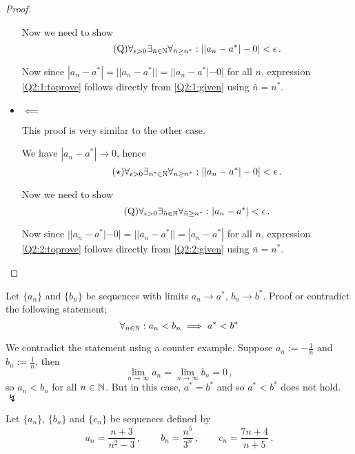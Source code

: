 \documentclass[week=2]{homework}
\begin{document}
\begin{questions}
\begin{proof}
\begin{itemize}
	    		Now we need to show
	    		\begin{equation} \label{Q2:1:toprove} \tag{Q}
		    		\forall_{\epsilon > 0}\exists_{\bar n \in \naturals}\forall_{\bar n \geq n^*}: ||a_n - a^*|-0| < \epsilon\,.
	    		\end{equation}
	    		
	    		Now since $|a_n - a^*| = ||a_n - a^*|| = ||a_n - a^*|-0|$ for all $n$, expression \ref{Q2:1:toprove} follows directly from \ref{Q2:1:given} using $\bar n = n^*$.
	    		
	    		\item $\impliedby$
	    		
	    		This proof is very similar to the other case.
	    		
	    		We have $|a_n-a^*| \to 0$, hence
	    		\begin{equation} \label{Q2:2:given} \tag{$\star$}
	    		\forall_{\epsilon > 0}\exists_{n^* \in \naturals}\forall_{n \geq n^*}: ||a_n - a^*|-0| < \epsilon\,.
	    		\end{equation}
	    		
	    		Now we need to show
	    		\begin{equation} \label{Q2:2:toprove} \tag{Q}
	    		\forall_{\epsilon > 0}\exists_{\bar n \in \naturals}\forall_{\bar n \geq n^*}: |a_n - a^*| < \epsilon\,.
	    		\end{equation}
	    		
	    		Now since $||a_n - a^*|-0| = ||a_n - a^*|| = |a_n - a^*|$ for all $n$, expression \ref{Q2:2:toprove} follows directly from \ref{Q2:2:given} using $\bar n = n^*$.
	    	\end{itemize}
	    \end{proof}
    
	    \question
	    Let $\{a_n\}$ and $\{b_n\}$ be sequences with limits $a_n \to a^*$, $b_n \to b^*$.
	    Proof or contradict the following statement;
	    \[
		    \forall_{n \in \mathbb{N}}: a_n < b_n \implies a^* < b^*
	    \]
	    
	    We contradict the statement using a counter example. Suppose $a_n := -\frac{1}{n}$ and $b_n := \frac{1}{n}$, then
	    \[
		    \lim_{n\to\infty} a_n = \lim_{n\to\infty} b_n = 0\,,
	    \]
	    so $a_n < b_n$ for all $n \in \mathbb{N}$. But in this case, $a^* = b^*$ and so $a^* < b^*$ does not hold. $\lightning$
	    
	    \question
	    Let $\{a_n\}$, $\{b_n\}$ and $\{c_n\}$ be sequences defined by
	    \[
		    a_n = \frac{n+3}{n^2-3}\,,\qquad b_n = \frac{n^5}{3^n}\,,\qquad c_n = \frac{7n+4}{n+5}\,.
	    \]
	    

\end{questions}
\end{document}
